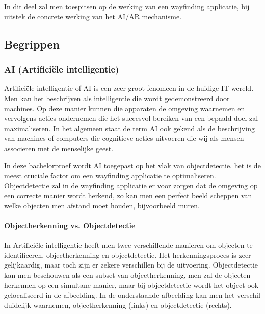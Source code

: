 \chapter{}
\label{ch:stand-van-zaken}




In dit deel zal men toespitsen op de werking van een wayfinding applicatie, bij uitstek de concrete werking van het AI/AR mechanisme.

\section{Begrippen}
\subsection{AI (Artificiële intelligentie)}
Artificiële intelligentie of AI is een zeer groot fenomeen in de huidige IT-wereld. Men kan het beschrijven als intelligentie die wordt gedemonstreerd door machines. Op deze manier kunnen die apparaten de omgeving waarnemen en vervolgens acties ondernemen die het succesvol bereiken van een bepaald doel zal maximaliseren. In het algemeen staat de term AI ook gekend als de beschrijving van machines of computers die cognitieve acties uitvoeren die wij als mensen associeren met de menselijke geest.

In deze bachelorproef wordt AI toegepast op het vlak van objectdetectie, het is de meest cruciale factor om een wayfinding applicatie te optimaliseren.
Objectdetectie zal in de wayfinding applicatie er voor zorgen dat de omgeving op een correcte manier wordt herkend, zo kan men een perfect beeld scheppen van welke objecten men afstand moet houden, bijvoorbeeld muren.

\subsubsection{Objectherkenning vs. Objectdetectie}
In Artificiële intelligentie heeft men twee verschillende manieren om objecten te identificeren, objectherkenning en objectdetectie. Het herkenningsproces is zeer gelijkaardig, maar toch zijn er zekere verschillen bij de uitvoering. Objectdetectie kan men beschouwen als een subset van objectherkenning, men zal de objecten herkennen op een simultane manier, maar bij objectdetectie wordt het object ook gelocaliseerd in de afbeelding. In de onderstaande afbeelding kan men het verschil duidelijk waarnemen, objectherkenning (links) en objectdetectie (rechts). \autocite{ObjRec2020}

